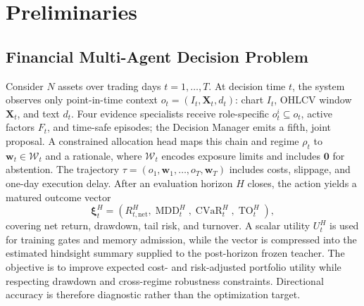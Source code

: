 \section{Preliminaries}
\label{sec:problem}

\subsection{Financial Multi-Agent Decision Problem}

Consider $N$ assets over trading days $t=1,\ldots,T$. At decision time $t$, the system observes only point-in-time context $o_t=(I_t,\mathbf X_t,d_t)$: chart $I_t$, OHLCV window $\mathbf X_t$, and text $d_t$. Four evidence specialists receive role-specific $o_t^i\subseteq o_t$, active factors $F_t$, and time-safe episodes; the Decision Manager emits a fifth, joint proposal. A constrained allocation head maps this chain and regime $\rho_t$ to $\mathbf w_t\in\mathcal W_t$ and a rationale, where $\mathcal W_t$ encodes exposure limits and includes $\mathbf0$ for abstention. The trajectory $\tau=(o_1,\mathbf w_1,\ldots,o_T,\mathbf w_T)$ includes costs, slippage, and one-day execution delay.
After an evaluation horizon $H$ closes, the action yields a matured outcome vector
\begin{equation}
\boldsymbol\xi_t^H=
\left(R_{t,\mathrm{net}}^H,\operatorname{MDD}_t^H,
\operatorname{CVaR}_t^H,\operatorname{TO}_t^H\right),
\label{eq:outcome_vector}
\end{equation}
covering net return, drawdown, tail risk, and turnover. A scalar utility $U_t^H$ is used for training gates and memory admission, while the vector is compressed into the estimated hindsight summary supplied to the post-horizon frozen teacher. The objective is to improve expected cost- and risk-adjusted portfolio utility while respecting drawdown and cross-regime robustness constraints. Directional accuracy is therefore diagnostic rather than the optimization target.


